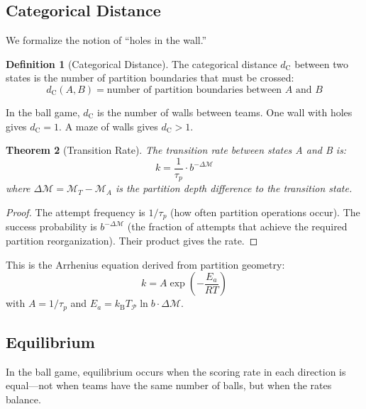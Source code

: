 ﻿\documentclass[twocolumn,10pt,a4paper]{article}
\newtheorem{theorem}{Theorem}[section]
\theoremstyle{definition}
\newtheorem{definition}[theorem]{Definition}
\theoremstyle{remark}
\newcommand{\kB}{k_{\mathrm{B}}}
\newcommand{\Depth}{\mathcal{M}}
\newcommand{\Part}{\mathcal{P}}
\newcommand{\dC}{d_{\mathrm{C}}}
\begin{document}
\subsection{Categorical Distance}

We formalize the notion of ``holes in the wall.''

\begin{definition}[Categorical Distance]
\label{def:distance}
The categorical distance $\dC$ between two states is the number of partition boundaries that must be crossed:
\begin{equation}
    \dC(A, B) = \text{number of partition boundaries between } A \text{ and } B
\end{equation}
\end{definition}

In the ball game, $\dC$ is the number of walls between teams. One wall with holes gives $\dC = 1$. A maze of walls gives $\dC > 1$.

\begin{theorem}[Transition Rate]
\label{thm:rate}
The transition rate between states A and B is:
\begin{equation}
    k = \frac{1}{\tau_p} \cdot b^{-\Delta\Depth}
\end{equation}
where $\Delta\Depth = \Depth_T - \Depth_A$ is the partition depth difference to the transition state.
\end{theorem}

\begin{proof}
The attempt frequency is $1/\tau_p$ (how often partition operations occur). The success probability is $b^{-\Delta\Depth}$ (the fraction of attempts that achieve the required partition reorganization). Their product gives the rate.
\end{proof}

This is the Arrhenius equation derived from partition geometry:
\begin{equation}
    k = A \exp\left(-\frac{E_a}{RT}\right)
\end{equation}
with $A = 1/\tau_p$ and $E_a = \kB T_{\Part} \ln b \cdot \Delta\Depth$.

\subsection{Equilibrium}

In the ball game, equilibrium occurs when the scoring rate in each direction is equal---not when teams have the same number of balls, but when the rates balance.
\end{document}
